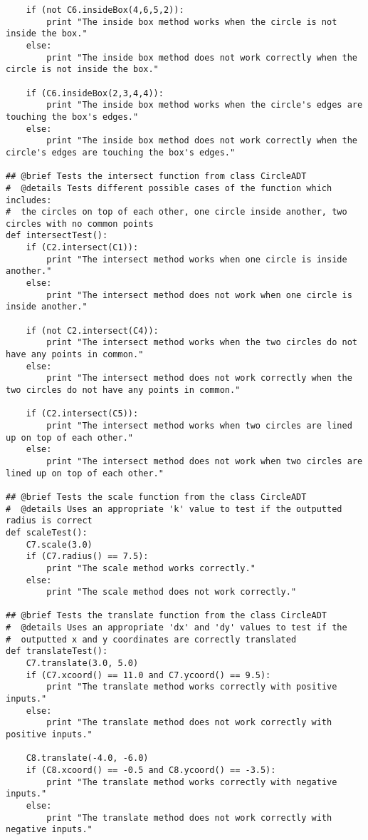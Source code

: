 \documentclass[12pt]{article}
\begin{document}
\begin{lstlisting}
    if (not C6.insideBox(4,6,5,2)):
        print "The inside box method works when the circle is not inside the box."
    else:
        print "The inside box method does not work correctly when the circle is not inside the box."

    if (C6.insideBox(2,3,4,4)):
        print "The inside box method works when the circle's edges are touching the box's edges."
    else:
        print "The inside box method does not work correctly when the circle's edges are touching the box's edges."

## @brief Tests the intersect function from class CircleADT
#  @details Tests different possible cases of the function which includes:
#  the circles on top of each other, one circle inside another, two circles with no common points
def intersectTest():
    if (C2.intersect(C1)):
        print "The intersect method works when one circle is inside another."
    else:
        print "The intersect method does not work when one circle is inside another."

    if (not C2.intersect(C4)):
        print "The intersect method works when the two circles do not have any points in common."
    else:
        print "The intersect method does not work correctly when the two circles do not have any points in common."

    if (C2.intersect(C5)):
        print "The intersect method works when two circles are lined up on top of each other."
    else:
        print "The intersect method does not work when two circles are lined up on top of each other."

## @brief Tests the scale function from the class CircleADT
#  @details Uses an appropriate 'k' value to test if the outputted radius is correct
def scaleTest():
    C7.scale(3.0)
    if (C7.radius() == 7.5):
        print "The scale method works correctly."
    else:
        print "The scale method does not work correctly."

## @brief Tests the translate function from the class CircleADT
#  @details Uses an appropriate 'dx' and 'dy' values to test if the
#  outputted x and y coordinates are correctly translated
def translateTest():
    C7.translate(3.0, 5.0)
    if (C7.xcoord() == 11.0 and C7.ycoord() == 9.5):
        print "The translate method works correctly with positive inputs."
    else:
        print "The translate method does not work correctly with positive inputs."

    C8.translate(-4.0, -6.0)
    if (C8.xcoord() == -0.5 and C8.ycoord() == -3.5):
        print "The translate method works correctly with negative inputs."
    else:
        print "The translate method does not work correctly with negative inputs."


\end{lstlisting}
\end{document}
